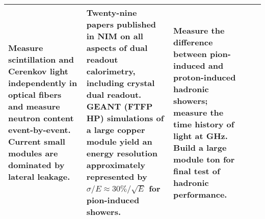 \begin{landscape}
\begin{adjustbox}{max width=1\textheight,totalheight=1\textwidth}
\begin{tabularx}{2\textheight}{lXXXX}
     Measure scintillation and Cerenkov light independently in optical fibers and measure neutron content event-by-event. Current small modules are dominated by lateral leakage. &
     Twenty-nine papers published in NIM on all aspects of dual readout calorimetry, including crystal dual readout. GEANT (FTFP HP) simulations of a large copper module yield an energy resolution approximately represented by $\sigma/E \approx 30\%/\sqrt{E}$ for pion-induced showers. &
     Measure the difference between pion-induced and proton-induced hadronic showers; measure the time history of light at \unit[5]{GHz}. Build a large module \unit[4]{ton} for final test of hadronic performance. \\
    \bottomrule
\end{tabularx}
\end{adjustbox}
\end{landscape}
\restoregeometry
